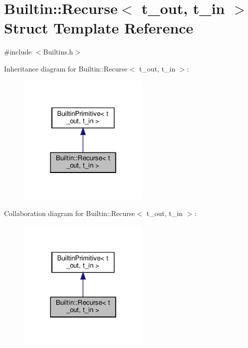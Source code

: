 \hypertarget{struct_builtin_1_1_recurse}{}\section{Builtin\+:\+:Recurse$<$ t\+\_\+out, t\+\_\+in $>$ Struct Template Reference}
\label{struct_builtin_1_1_recurse}


{\ttfamily \#include $<$Builtins.\+h$>$}



Inheritance diagram for Builtin\+:\+:Recurse$<$ t\+\_\+out, t\+\_\+in $>$\+:\nopagebreak
\begin{figure}[H]
\begin{center}
\leavevmode
\includegraphics[width=178pt]{struct_builtin_1_1_recurse__inherit__graph}
\end{center}
\end{figure}


Collaboration diagram for Builtin\+:\+:Recurse$<$ t\+\_\+out, t\+\_\+in $>$\+:\nopagebreak
\begin{figure}[H]
\begin{center}
\leavevmode
\includegraphics[width=178pt]{struct_builtin_1_1_recurse__coll__graph}
\end{center}
\end{figure}
